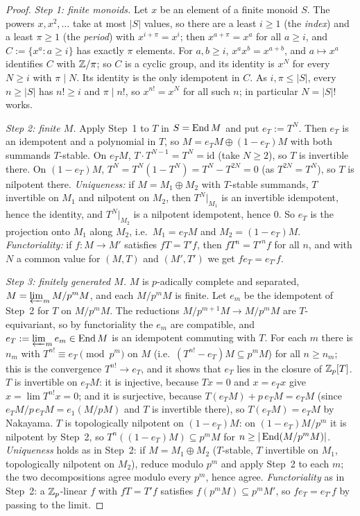 \begin{proof}
\emph{Step 1: finite monoids.} Let $x$ be an element of a finite monoid $S$. The powers $x,x^2,\dots$ take at most $|S|$ values, so
there are a least $i\ge1$ (the \emph{index}) and a least $\pi\ge1$ (the \emph{period}) with $x^{i+\pi}=x^i$; then $x^{a+\pi}=x^a$ for
all $a\ge i$, and $C:=\{x^a:a\ge i\}$ has exactly $\pi$ elements. For $a,b\ge i$, $x^ax^b=x^{a+b}$, and $a\mapsto x^a$ identifies $C$
with $\mathbb{Z}/\pi$; so $C$ is a cyclic group, and its identity is $x^N$ for every $N\ge i$ with $\pi\mid N$. Its identity is the only
idempotent in $C$. As $i,\pi\le|S|$, every $n\ge|S|$ has $n!\ge i$ and $\pi\mid n!$, so $x^{n!}=x^N$ for all such $n$; in
particular $N=|S|!$ works.

\emph{Step 2: finite $M$.} Apply Step~1 to $T$ in $S=\operatorname{End} M$ and put $e_T:=T^N$. Then $e_T$ is an idempotent and a polynomial in $T$,
so $M=e_TM\oplus(1-e_T)M$ with both summands $T$-stable. On $e_TM$, $T\cdot T^{N-1}=T^N=\mathrm{id}$ (take $N\ge2$), so $T$ is
invertible there. On $(1-e_T)M$, $T^N=T^N(1-T^N)=T^N-T^{2N}=0$ (as $T^{2N}=T^N$), so $T$ is nilpotent there. \emph{Uniqueness:} if
$M=M_1\oplus M_2$ with $T$-stable summands, $T$ invertible on $M_1$ and nilpotent on $M_2$, then $T^N|_{M_1}$ is an invertible
idempotent, hence the identity, and $T^N|_{M_2}$ is a nilpotent idempotent, hence $0$. So $e_T$ is the projection onto $M_1$
along $M_2$, i.e.\ $M_1=e_TM$ and $M_2=(1-e_T)M$. \emph{Functoriality:} if $f:M\to M'$ satisfies $fT=T'f$, then $fT^n=T'^nf$ for all
$n$, and with $N$ a common value for $(M,T)$ and $(M',T')$ we get $fe_T=e_{T'}f$.

\emph{Step 3: finitely generated $M$.} $M$ is $p$-adically complete and separated, $M=\varprojlim_mM/p^mM$, and each $M/p^mM$ is
finite. Let $e_m$ be the idempotent of Step~2 for $T$ on $M/p^mM$. The reductions $M/p^{m+1}M\to M/p^mM$ are $T$-equivariant, so
by functoriality the $e_m$ are compatible, and $e_T:=\varprojlim_me_m\in\operatorname{End} M$ is an idempotent commuting with $T$. For each $m$
there is $n_m$ with $T^{n!}\equiv e_T\pmod{p^m}$ on $M$ (i.e.\ $(T^{n!}-e_T)M\subseteq p^mM$) for all $n\ge n_m$; this is the
convergence $T^{n!}\to e_T$, and it shows that $e_T$ lies in the closure of $\mathbb{Z}_p[T]$. $T$ is invertible on $e_TM$: it is injective,
because $Tx=0$ and $x=e_Tx$ give $x=\lim T^{n!}x=0$; and it is surjective, because $T(e_TM)+p\,e_TM=e_TM$ (since
$e_TM/p\,e_TM=e_1(M/pM)$ and $T$ is invertible there), so $T(e_TM)=e_TM$ by Nakayama. $T$ is topologically nilpotent on
$(1-e_T)M$: on $(1-e_T)M/p^m$ it is nilpotent by Step~2, so $T^n((1-e_T)M)\subseteq p^mM$ for $n\ge|\operatorname{End}(M/p^mM)|$.
\emph{Uniqueness} holds as in Step~2: if $M=M_1\oplus M_2$ ($T$-stable, $T$ invertible on $M_1$, topologically nilpotent on $M_2$),
reduce modulo $p^m$ and apply Step~2 to each $m$; the two decompositions agree modulo every $p^m$, hence agree. \emph{Functoriality}
as in Step~2: a $\mathbb{Z}_p$-linear $f$ with $fT=T'f$ satisfies $f(p^mM)\subseteq p^mM'$, so $fe_T=e_{T'}f$ by passing to the limit.


\end{proof}
